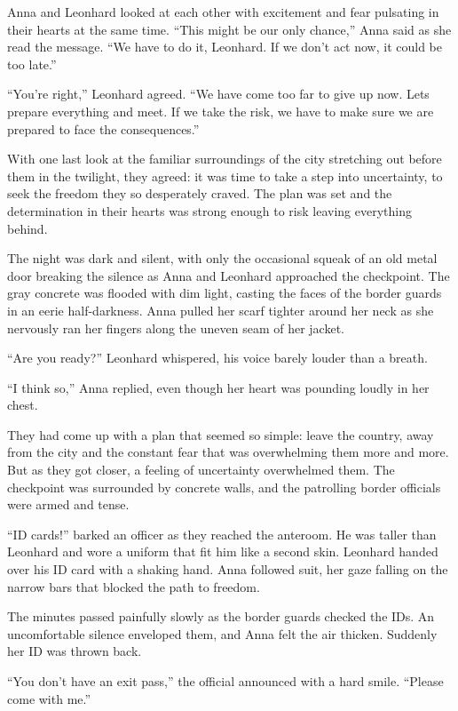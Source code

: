 \documentclass[
]{article}
\begin{document}
Anna and Leonhard looked at each other with excitement and fear
pulsating in their hearts at the same time. ``This might be our only
chance,'' Anna said as she read the message. ``We have to do it,
Leonhard. If we don't act now, it could be too late.''

``You're right,'' Leonhard agreed. ``We have come too far to give up
now. Let\textquotesingle s prepare everything and meet. If we take the
risk, we have to make sure we are prepared to face the consequences.''

With one last look at the familiar surroundings of the city stretching
out before them in the twilight, they agreed: it was time to take a step
into uncertainty, to seek the freedom they so desperately craved. The
plan was set and the determination in their hearts was strong enough to
risk leaving everything behind.

The night was dark and silent, with only the occasional squeak of an old
metal door breaking the silence as Anna and Leonhard approached the
checkpoint. The gray concrete was flooded with dim light, casting the
faces of the border guards in an eerie half-darkness. Anna pulled her
scarf tighter around her neck as she nervously ran her fingers along the
uneven seam of her jacket.

``Are you ready?'' Leonhard whispered, his voice barely louder than a
breath.

``I think so,'' Anna replied, even though her heart was pounding loudly
in her chest.

They had come up with a plan that seemed so simple: leave the country,
away from the city and the constant fear that was overwhelming them more
and more. But as they got closer, a feeling of uncertainty overwhelmed
them. The checkpoint was surrounded by concrete walls, and the
patrolling border officials were armed and tense.

``ID cards!'' barked an officer as they reached the anteroom. He was
taller than Leonhard and wore a uniform that fit him like a second skin.
Leonhard handed over his ID card with a shaking hand. Anna followed
suit, her gaze falling on the narrow bars that blocked the path to
freedom.

The minutes passed painfully slowly as the border guards checked the
IDs. An uncomfortable silence enveloped them, and Anna felt the air
thicken. Suddenly her ID was thrown back.

``You don't have an exit pass,'' the official announced with a hard
smile. ``Please come with me.''
\end{document}
